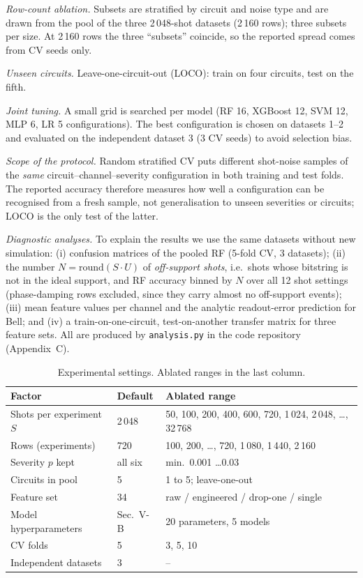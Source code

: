 \documentclass[conference]{IEEEtran}
\begin{document}
\emph{Row-count ablation.} Subsets are stratified by circuit and noise type and are drawn from the pool of the three 2\,048-shot datasets (2\,160 rows); three subsets per size. At 2\,160 rows the three ``subsets'' coincide, so the reported spread comes from CV seeds only.

\emph{Unseen circuits.} Leave-one-circuit-out (LOCO): train on four circuits, test on the fifth.

\emph{Joint tuning.} A small grid is searched per model (RF 16, XGBoost 12, SVM 12, MLP 6, LR 5 configurations). The best configuration is chosen on datasets 1--2 and evaluated on the independent dataset 3 (3 CV seeds) to avoid selection bias.

\emph{Scope of the protocol.} Random stratified CV puts different shot-noise samples of the \emph{same} circuit--channel--severity configuration in both training and test folds. The reported accuracy therefore measures how well a configuration can be recognised from a fresh sample, not generalisation to unseen severities or circuits; LOCO is the only test of the latter.

\emph{Diagnostic analyses.} To explain the results we use the same datasets without new simulation: (i) confusion matrices of the pooled RF (5-fold CV, 3 datasets); (ii) the number $N=\mathrm{round}(S\cdot U)$ of \emph{off-support shots}, i.e.\ shots whose bitstring is not in the ideal support, and RF accuracy binned by $N$ over all 12 shot settings (phase-damping rows excluded, since they carry almost no off-support events); (iii) mean feature values per channel and the analytic readout-error prediction for Bell; and (iv) a train-on-one-circuit, test-on-another transfer matrix for three feature sets. All are produced by \texttt{analysis.py} in the code repository (Appendix~C).

\begin{table}[!t]
\caption{Experimental settings. Ablated ranges in the last column.}
\label{tab:setup}
\centering\footnotesize\setlength{\tabcolsep}{3pt}
\begin{tabular}{@{}p{1.1in}p{0.5in}p{1.55in}@{}}
\toprule
Factor & Default & Ablated range\\
\midrule
Shots per experiment $S$ & 2\,048 & 50, 100, 200, 400, 600, 720, 1\,024, 2\,048, \dots, 32\,768\\
Rows (experiments) & 720 & 100, 200, \dots, 720, 1\,080, 1\,440, 2\,160\\
Severity $p$ kept & all six & min.\ 0.001 \dots 0.03\\
Circuits in pool & 5 & 1 to 5; leave-one-out\\
Feature set & 34 & raw / engineered / drop-one / single\\
Model hyperparameters & Sec.~V-B & 20 parameters, 5 models\\
CV folds & 5 & 3, 5, 10\\
Independent datasets & 3 & --\\
\bottomrule
\end{tabular}
\end{table}
\end{document}
